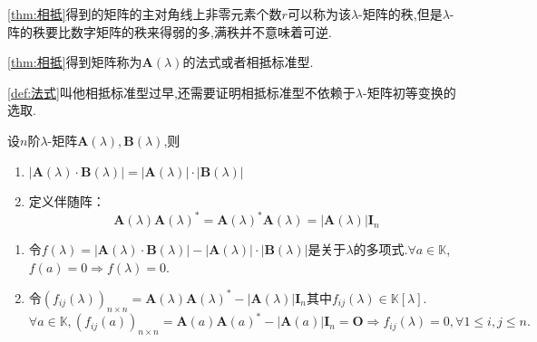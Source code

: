 \begin{red}
\begin{remark}
    \cref{thm:相抵}得到的矩阵的主对角线上非零元素个数$r$可以称为该$\lambda$-矩阵的秩,但是$\lambda$-阵的秩要比数字矩阵的秩来得弱的多,满秩并不意味着可逆.
\end{remark}
\end{red}
\begin{formal}
\begin{definition}[法式]\label{def:法式}
    \cref{thm:相抵}得到矩阵称为$\bm{A}\left(\lambda\right)$的法式或者相抵标准型.
\end{definition}
\end{formal}
\begin{red}
\begin{remark}
    \cref{def:法式}叫他相抵标准型过早,还需要证明相抵标准型不依赖于$\lambda$-矩阵初等变换的选取.
\end{remark}
\end{red}
\begin{green}
\begin{lemma}[积的行列式]\label{lem:积的行列式}
    设$n$阶$\lambda$-矩阵$\bm{A}\left(\lambda\right),\bm{B}\left(\lambda\right)$,则
    \begin{enumerate}[label={\textup{(\arabic*)}}]
        \item $\left|\bm{A}\left(\lambda\right)\cdot\bm{B}\left(\lambda\right)\right|=\left|\bm{A}\left(\lambda\right)\right|\cdot\left|\bm{B}\left(\lambda\right)\right|$
        \item 定义伴随阵：
        \[
        \bm{A}\left(\lambda\right)\bm{A}\left(\lambda\right)^*=\bm{A}\left(\lambda\right)^*\bm{A}\left(\lambda\right)=\left|\bm{A}\left(\lambda\right)\right|\bm{I}_n
        \]
    \end{enumerate}
\end{lemma}
\begin{Proof}
\begin{enumerate}[label={\textup{(\arabic*)}}]
    \item 令$f\left(\lambda\right)=
    \left|\bm{A}\left(\lambda\right)\cdot\bm{B}\left(\lambda\right)\right|-\left|\bm{A}\left(\lambda\right)\right|\cdot\left|\bm{B}\left(\lambda\right)\right|
    $是关于$\lambda$的多项式.$\forall a\in \mathbb{K}$,$f\left(a\right)=0\Longrightarrow f\left(\lambda\right)=0.$
    \item 令$\left(f_{ij}\left(\lambda\right)\right)_{n\times n}=
    \bm{A}\left(\lambda\right)\bm{A}\left(\lambda\right)^*-\left|
        \bm{A}\left(\lambda\right)
    \right|\bm{I}_n
    $其中$f_{ij}\left(\lambda\right)\in \mathbb{K}\left[\lambda\right]$.$\forall a\in \mathbb{K},
    \left(f_{ij}\left(a\right)\right)_{n\times n}=\bm{A}\left(a\right)
    \bm{A}\left(a\right)^*-\left|\bm{A}\left(a\right)\right|\bm{I}_n=\bm{O}\Longrightarrow
    f_{ij}\left(\lambda\right)=0,\forall 1\leqslant i,j\leqslant n.$\qedhere
\end{enumerate}
\end{Proof}
\end{green}
